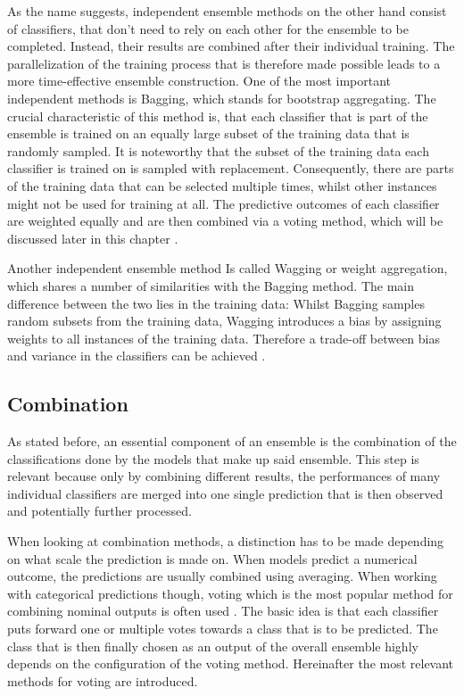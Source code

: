 As the name suggests, independent ensemble methods on the other hand consist of classifiers, that don’t need to rely on each other for the ensemble to be completed. Instead, their results are combined after their individual training. The parallelization of the training process that is therefore made possible leads to a more time-effective ensemble construction. One of the most important independent methods is Bagging, which stands for bootstrap aggregating. The crucial characteristic of this method is, that each classifier that is part of the ensemble is trained on an equally large subset of the training data that is randomly sampled. It is noteworthy that the subset of the training data each classifier is trained on is sampled with replacement. Consequently, there are parts of the training data that can be selected multiple times, whilst other instances might not be used for training at all. The predictive outcomes of each classifier are weighted equally and are then combined via a voting method, which will be discussed later in this chapter \cite{martinez-munoz2004}.

Another independent ensemble method Is called Wagging or weight aggregation, which shares a number of similarities with the Bagging method. The main difference between the two lies in the training data: Whilst Bagging samples random subsets from the training data, Wagging introduces a bias by assigning weights to all instances of the training data. Therefore a trade-off between bias and variance in the classifiers can be achieved \cite{bauer1999}.



\subsection{Combination}

As stated before, an essential component of an ensemble is the combination of the classifications done by the models that make up said ensemble. This step is relevant because only by combining different results, the performances of many individual classifiers are merged into one single prediction that is then observed and potentially further processed. 

When looking at combination methods, a distinction has to be made depending on what scale the prediction is made on. When models predict a numerical outcome, the predictions are usually combined using averaging. When working with categorical predictions though, voting which is the most popular method for combining nominal outputs is often used \cite{zhou2012}. The basic idea is that each classifier puts forward one or multiple votes towards a class that is to be predicted. The class that is then finally chosen as an output of the overall ensemble highly depends on the configuration of the voting method. Hereinafter the most relevant methods for voting are introduced. 

